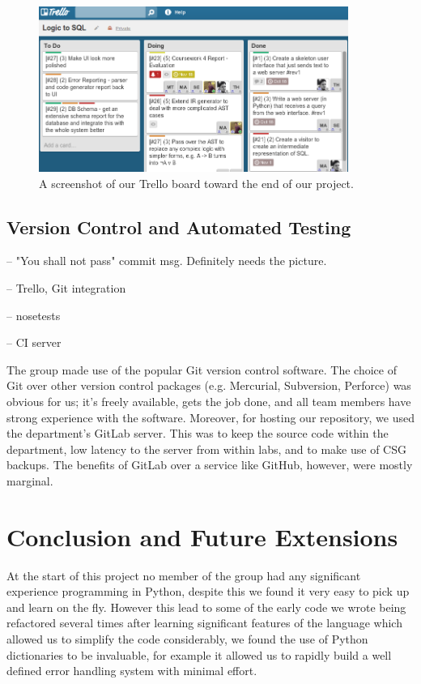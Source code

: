 \documentclass[a4paper, 11pt]{article}
\begin{document}
    \begin{figure}[H]
      \centering
      \includegraphics[width=0.9\textwidth]{images/trello.png}
      \caption{A screenshot of our Trello board toward the end of our project.}
    \end{figure}

  \subsection{Version Control and Automated Testing}
    -- "You shall not pass" commit msg. Definitely needs the picture.

    -- Trello, Git integration

    -- nosetests

    -- CI server

    The group made use of the popular Git\cite{git} version control software.
    The choice of Git over other version control packages (e.g. Mercurial,
    Subversion, Perforce) was obvious for us; it's freely available, gets the
    job done, and all team members have strong experience with the software.
    Moreover, for hosting our repository, we used the department's GitLab
    server. This was to keep the source code within the department, low
    latency to the server from within labs, and to make use of CSG backups. The
    benefits of GitLab over a service like GitHub, however, were mostly
    marginal.

\section{Conclusion and Future Extensions}

  At the start of this project no member of the group had any significant
  experience programming in Python, despite this we found it very easy to pick
  up and learn on the fly. However this lead to some of the early code we
  wrote being refactored several times after learning significant features
  of the language which allowed us to simplify the code considerably, we found 
  the use of Python dictionaries to be invaluable, for example it allowed us to 
  rapidly build a well defined error handling system with minimal effort.
  
\end{document}

